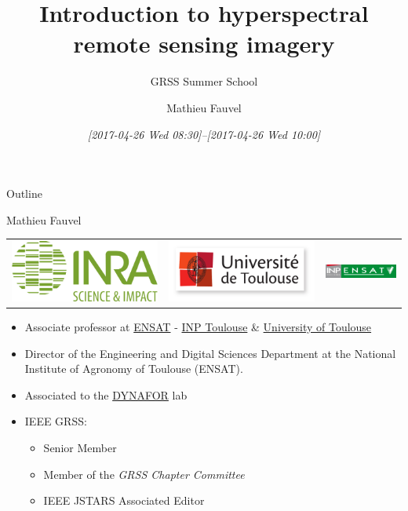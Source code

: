 \documentclass[10pt,aspectratio=1610]{beamer}
\author{Mathieu Fauvel}
\date{\textit{[2017-04-26 Wed 08:30]--[2017-04-26 Wed 10:00]}}
\title{Introduction to hyperspectral remote sensing imagery}
\subtitle{GRSS Summer School}
\institute{UMR Dynafor}
\begin{document}
\maketitle
\begin{frame}{Outline}
\tableofcontents
\end{frame}

\begin{frame}[label={sec:org021e7f9}]{Mathieu Fauvel}
\begin{center}
\begin{tabular}{ccc}
  \includegraphics[width=0.3\linewidth]{figures/logo-INRA-transp.png}
  &\includegraphics[width=0.3\linewidth]{figures/logoUT.pdf}
  &\includegraphics[width=0.3\linewidth]{figures/inp-ensat.jpg}
\end{tabular}
\end{center}
\begin{itemize}
\item Associate professor at  \href{http://ensat.fr/}{ENSAT} - \href{http://inp-toulouse.fr/}{INP Toulouse} \& \href{http://www.univ-toulouse.fr/}{University of Toulouse}
\item Director of the Engineering and Digital Sciences Department at the National Institute of Agronomy of Toulouse (ENSAT).
\item Associated to the \href{http://dynafor.toulouse.inra.fr/}{DYNAFOR} lab
\item IEEE GRSS:
\begin{itemize}
\item Senior Member
\item Member of the \emph{GRSS Chapter Committee}
\item IEEE JSTARS Associated Editor
\end{itemize}
\end{itemize}
\end{frame}
\end{document}
